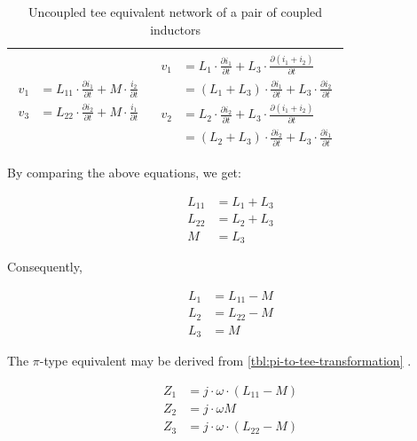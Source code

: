 \begin{table}[H]
\begin{tabular}{ | c | c | }
\begin{minipage}{.4\textwidth}
         {\begin{align}
           v_1 &= L_{11} \cdot  \frac{\partial i_1}{\partial t}  + M \cdot \frac{i_2}{\partial t}\\
           v_3 &= L_{22} \cdot  \frac{\partial i_2}{\partial t}  + M \cdot \frac{i_1}{\partial t}
         \end{align}}
    \end{minipage}
    &
        \begin{minipage}{.4\textwidth}
         {\begin{align}
           v_1 &= L_1 \cdot \frac{\partial i_1}{\partial t} + L_3 \cdot \frac{\partial (i_1 + i_2)}{\partial t} \\
               &= (L_1 + L_3) \cdot \frac{\partial i_1}{\partial t} + L_3 \cdot \frac{\partial i_2}{\partial t} \\
           v_2 &= L_2 \cdot \frac{\partial i_2}{\partial t} + L_3 \cdot \frac{\partial (i_1 + i_2)}{\partial t} \\
               &= (L_2 + L_3) \cdot \frac{\partial i_2}{\partial t} + L_3 \cdot \frac{\partial i_1}{\partial t}
         \end{align}}
    \end{minipage}
    \\ \hline
  \end{tabular}
  \caption{Uncoupled tee equivalent network of a pair of coupled inductors}
  \label{tbl:tee-coupled-inductors}
\end{table}

\noindent By comparing the above equations, we get:

\begin{align}
   L_{11} &= L_1 + L_3 \\
   L_{22} &= L_2 + L_3 \\
   M &= L_3
\end{align}

\noindent Consequently,

\begin{align}
   L_1 &= L_{11} - M \\
   L_2 &= L_{22} - M \\
   L_3 &= M
\end{align}

\noindent The $\pi$-type equivalent may be derived from \ref{tbl:pi-to-tee-transformation} .

\begin{align}
   Z_1 &= j \cdot \omega \cdot (L_{11} - M) \\
   Z_2 &= j \cdot \omega M \\
   Z_3 &= j \cdot \omega \cdot (L_{22} - M)
\end{align}

